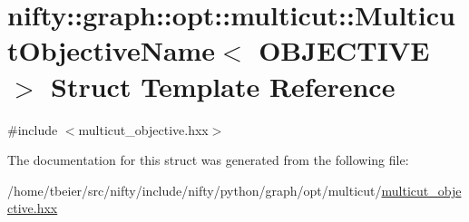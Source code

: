 \hypertarget{structnifty_1_1graph_1_1opt_1_1multicut_1_1MulticutObjectiveName}{}\section{nifty\+:\+:graph\+:\+:opt\+:\+:multicut\+:\+:Multicut\+Objective\+Name$<$ O\+B\+J\+E\+C\+T\+I\+VE $>$ Struct Template Reference}
\label{structnifty_1_1graph_1_1opt_1_1multicut_1_1MulticutObjectiveName}


{\ttfamily \#include $<$multicut\+\_\+objective.\+hxx$>$}



The documentation for this struct was generated from the following file\+:\begin{DoxyCompactItemize}
\item 
/home/tbeier/src/nifty/include/nifty/python/graph/opt/multicut/\hyperlink{python_2graph_2opt_2multicut_2multicut__objective_8hxx}{multicut\+\_\+objective.\+hxx}\end{DoxyCompactItemize}
